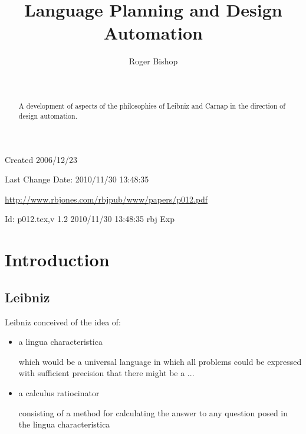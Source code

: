 \documentclass[numreferences]{rbjk}
\begin{document}
                                                                                   
\begin{article}
\begin{opening}  
\title{Language Planning and Design Automation}
\author{Roger Bishop }
\date{$ $\ $ $}

\begin{abstract}
A development of aspects of the philosophies of Leibniz and Carnap in the direction of design automation.
\end{abstract}

\end{opening}

\vfill

\begin{centering}
\footnotesize{
Created 2006/12/23

Last Change $ $Date: 2010/11/30 13:48:35 $ $

\href{http://www.rbjones.com/rbjpub/www/papers/p012.pdf}{http://www.rbjones.com/rbjpub/www/papers/p012.pdf}

$ $Id: p012.tex,v 1.2 2010/11/30 13:48:35 rbj Exp $ $\\

}%
\end{centering}

\newpage
\setcounter{tocdepth}{4}
{\parskip-0pt\tableofcontents}

\section{Introduction}

\subsection{Leibniz}

Leibniz conceived of the idea of:

\begin{itemize}
\item a lingua characteristica

which would be a universal language in which all problems could be expressed with sufficient precision that there might be a ...

\item a calculus ratiocinator

consisting of a method for calculating the answer to any question posed in the lingua characteristica


\end{itemize}
\end{article}
\end{document}
